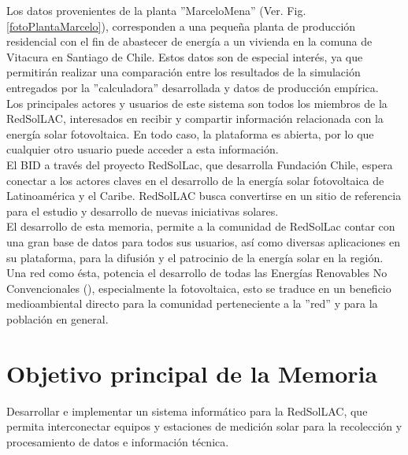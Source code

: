 Los datos provenientes de la planta ''MarceloMena'' (Ver. Fig. \ref{fotoPlantaMarcelo}), corresponden a una pequeña planta de producción residencial con el fin de abastecer de energía a un vivienda en la comuna de Vitacura en Santiago de Chile. Estos datos son de especial interés, ya que permitirán realizar una comparación entre los resultados de la simulación entregados por la ''calculadora'' desarrollada y datos de producción empírica.\\

Los principales actores y usuarios de este sistema son todos los miembros de la RedSolLAC, interesados en recibir y compartir información relacionada con la energía solar fotovoltaica. En todo caso, la plataforma es abierta, por lo que cualquier otro usuario puede acceder a esta información.\\

El BID a través del proyecto RedSolLac, que desarrolla Fundación Chile, espera conectar a los actores claves en el desarrollo de la energía solar fotovoltaica de Latinoamérica y el Caribe. RedSolLAC busca convertirse en un sitio de referencia para el estudio y desarrollo de nuevas iniciativas solares.\\

El desarrollo de esta memoria, permite a la comunidad de RedSolLac contar con una gran base de datos para todos sus usuarios, así como diversas aplicaciones en su plataforma, para la difusión y el patrocinio de la energía solar en la región. Una red como ésta, potencia el desarrollo de todas las Energías Renovables No Convencionales (), especialmente la fotovoltaica, esto se traduce en un beneficio medioambiental directo para la comunidad perteneciente a la ''red'' y para la población en general.

\section{Objetivo principal de la Memoria}
	Desarrollar e implementar un sistema informático para la RedSolLAC, que permita interconectar equipos y estaciones de medición solar para la recolección y procesamiento de datos e información técnica.

